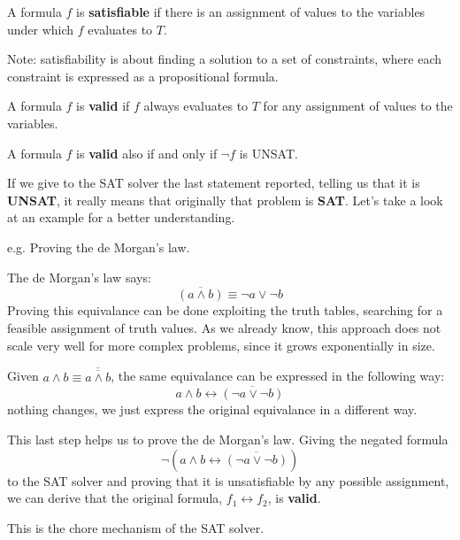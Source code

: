 \begin{definition}
    A formula $f$ is \textbf{satisfiable} if there is an assignment of values to the variables under which $f$ evaluates to $T$. \vspace{7pt}

    Note: satisfiability is about finding a solution to a set of constraints, where each constraint is expressed as a propositional formula.
\end{definition}
\begin{definition}
    A formula $f$ is \textbf{valid} if $f$ always evaluates to $T$ for any assignment of values to the variables. \vspace{7pt}

    A formula $f$ is \textbf{valid} also if and only if $\neg f$ is UNSAT.
\end{definition}
If we give to the SAT solver the last statement reported, telling us that it is \textbf{UNSAT}, it really means that originally that problem is \textbf{SAT}. Let's 
take a look at an example for a better understanding.
\begin{example}
    e.g. Proving the de Morgan's law. \vspace{7pt}

    The de Morgan's law says:
    $$ \overline{(a \wedge b)} \equiv \neg a \vee \neg b$$
    Proving this equivalance can be done exploiting the truth tables, searching for a feasible assignment of truth values. As we already know, this approach 
    does not scale very well for more complex problems, since it grows exponentially in size. \vspace{7pt}

    Given $a \wedge b \equiv \overline{\overline{a \wedge b}}$, the same equivalance can be expressed in the following way:
    $$ a \wedge b \leftrightarrow \overline{(\neg a \vee \neg b)} $$
    nothing changes, we just express the original equivalance in a different way. \vspace{7pt}

    This last step helps us to prove the de Morgan's law. Giving the negated formula
    $$ \neg (a \wedge b \leftrightarrow \overline{(\neg a \vee \neg b)}) $$
    to the SAT solver and proving that it is unsatisfiable by any possible assignment, we can derive that the original formula, $f_1 \leftrightarrow f_2$, is 
    \textbf{valid}. \vspace{7pt}

    This is the chore mechanism of the SAT solver.
\end{example}
